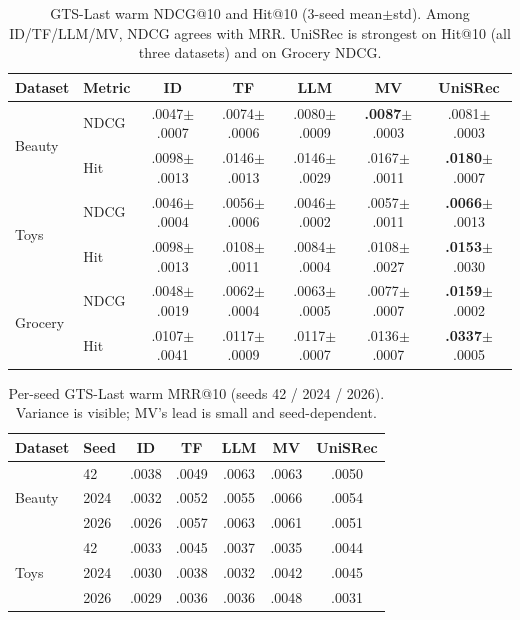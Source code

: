 \documentclass[sigconf,natbib=true,anonymous]{acmart}
\begin{document}
\begin{table}[t]
\centering
\caption{%
GTS-Last warm NDCG@10 and Hit@10 (3-seed mean$\pm$std).
Among ID/TF/LLM/MV, NDCG agrees with MRR.
UniSRec is strongest on Hit@10 (all three datasets) and on Grocery NDCG.
}
\label{tab:ndcg_hit}
\small
\setlength{\tabcolsep}{3pt}
\begin{tabular}{@{}llccccc@{}}
\toprule
Dataset & Metric & ID & TF & LLM & MV & UniSRec \\
\midrule
\multirow{2}{*}{Beauty}
 & NDCG & .0047\tiny{$\pm$.0007} & .0074\tiny{$\pm$.0006} & .0080\tiny{$\pm$.0009} & \textbf{.0087}\tiny{$\pm$.0003} & .0081\tiny{$\pm$.0003} \\
 & Hit  & .0098\tiny{$\pm$.0013} & .0146\tiny{$\pm$.0013} & .0146\tiny{$\pm$.0029} & .0167\tiny{$\pm$.0011} & \textbf{.0180}\tiny{$\pm$.0007} \\
\midrule
\multirow{2}{*}{Toys}
 & NDCG & .0046\tiny{$\pm$.0004} & .0056\tiny{$\pm$.0006} & .0046\tiny{$\pm$.0002} & .0057\tiny{$\pm$.0011} & \textbf{.0066}\tiny{$\pm$.0013} \\
 & Hit  & .0098\tiny{$\pm$.0013} & .0108\tiny{$\pm$.0011} & .0084\tiny{$\pm$.0004} & .0108\tiny{$\pm$.0027} & \textbf{.0153}\tiny{$\pm$.0030} \\
\midrule
\multirow{2}{*}{Grocery}
 & NDCG & .0048\tiny{$\pm$.0019} & .0062\tiny{$\pm$.0004} & .0063\tiny{$\pm$.0005} & .0077\tiny{$\pm$.0007} & \textbf{.0159}\tiny{$\pm$.0002} \\
 & Hit  & .0107\tiny{$\pm$.0041} & .0117\tiny{$\pm$.0009} & .0117\tiny{$\pm$.0007} & .0136\tiny{$\pm$.0007} & \textbf{.0337}\tiny{$\pm$.0005} \\
\bottomrule
\end{tabular}
\end{table}

\begin{table}[t]
\centering
\caption{%
Per-seed GTS-Last warm MRR@10 (seeds 42 / 2024 / 2026).
Variance is visible; MV's lead is small and seed-dependent.%
}
\label{tab:perseed}
\small
\setlength{\tabcolsep}{3.5pt}
\begin{tabular}{@{}llccccc@{}}
\toprule
Dataset & Seed & ID & TF & LLM & MV & UniSRec \\
\midrule
\multirow{3}{*}{Beauty}
 & 42    & .0038 & .0049 & .0063 & .0063 & .0050 \\
 & 2024  & .0032 & .0052 & .0055 & .0066 & .0054 \\
 & 2026  & .0026 & .0057 & .0063 & .0061 & .0051 \\
\midrule
\multirow{3}{*}{Toys}
 & 42    & .0033 & .0045 & .0037 & .0035 & .0044 \\
 & 2024  & .0030 & .0038 & .0032 & .0042 & .0045 \\
 & 2026  & .0029 & .0036 & .0036 & .0048 & .0031 \\
\bottomrule
\end{tabular}
\end{table}
\end{document}
